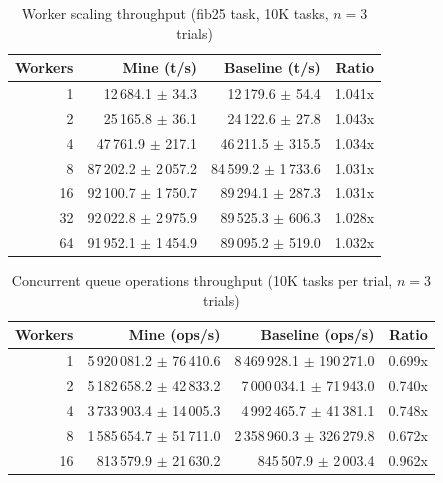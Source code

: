 \begin{table}[htbp]
\centering
\caption{Worker scaling throughput (fib25 task, 10K tasks, $n=3$ trials)}
\label{tab:scaling}
\begin{tabular}{rrrr}
\toprule
Workers & Mine (t/s) & Baseline (t/s) & Ratio \\
\midrule
1 & 12\,684.1 $\pm$ 34.3 & 12\,179.6 $\pm$ 54.4 & 1.041x \\
2 & 25\,165.8 $\pm$ 36.1 & 24\,122.6 $\pm$ 27.8 & 1.043x \\
4 & 47\,761.9 $\pm$ 217.1 & 46\,211.5 $\pm$ 315.5 & 1.034x \\
8 & 87\,202.2 $\pm$ 2\,057.2 & 84\,599.2 $\pm$ 1\,733.6 & 1.031x \\
16 & 92\,100.7 $\pm$ 1\,750.7 & 89\,294.1 $\pm$ 287.3 & 1.031x \\
32 & 92\,022.8 $\pm$ 2\,975.9 & 89\,525.3 $\pm$ 606.3 & 1.028x \\
64 & 91\,952.1 $\pm$ 1\,454.9 & 89\,095.2 $\pm$ 519.0 & 1.032x \\
\bottomrule
\end{tabular}
\end{table}

\begin{table}[htbp]
\centering
\caption{Concurrent queue operations throughput (10K tasks per trial, $n=3$ trials)}
\label{tab:queue_ops}
\begin{tabular}{rrrr}
\toprule
Workers & Mine (ops/s) & Baseline (ops/s) & Ratio \\
\midrule
1 & 5\,920\,081.2 $\pm$ 76\,410.6 & 8\,469\,928.1 $\pm$ 190\,271.0 & 0.699x \\
2 & 5\,182\,658.2 $\pm$ 42\,833.2 & 7\,000\,034.1 $\pm$ 71\,943.0 & 0.740x \\
4 & 3\,733\,903.4 $\pm$ 14\,005.3 & 4\,992\,465.7 $\pm$ 41\,381.1 & 0.748x \\
8 & 1\,585\,654.7 $\pm$ 51\,711.0 & 2\,358\,960.3 $\pm$ 326\,279.8 & 0.672x \\
16 & 813\,579.9 $\pm$ 21\,630.2 & 845\,507.9 $\pm$ 2\,003.4 & 0.962x \\
\bottomrule
\end{tabular}
\end{table}

